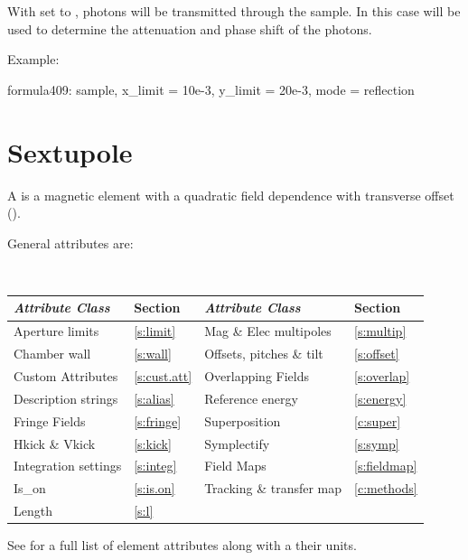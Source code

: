 {With  set to , photons will be transmitted
through the sample. In this case  will be used to
determine the attenuation and phase shift of the photons.

Example:
\begin{example}
  formula409: sample, x_limit = 10e-3, y_limit = 20e-3, mode = reflection
\end{example}

\newpage

\section{Sextupole}
\label{s:sex}

A  is a magnetic element with a quadratic field
dependence with transverse offset ().

General  attributes are:
\begin{center}
\tt
\begin{tabular}{llll} \toprule
  {\sl Attribute Class}      & Section           & {\sl Attribute Class}      & Section           \\ \midrule
  Aperture limits            & \ref{s:limit}     & Mag \& Elec multipoles     & \ref{s:multip}    \\
  Chamber wall               & \ref{s:wall}      & Offsets, pitches \& tilt   & \ref{s:offset}    \\
  Custom Attributes          & \ref{s:cust.att}  & Overlapping Fields         & \ref{s:overlap}   \\
  Description strings        & \ref{s:alias}     & Reference energy           & \ref{s:energy}    \\ 
  Fringe Fields              & \ref{s:fringe}    & Superposition              & \ref{c:super}     \\
  Hkick \& Vkick             & \ref{s:kick}      & Symplectify                & \ref{s:symp}      \\
  Integration settings       & \ref{s:integ}     & Field Maps                 & \ref{s:fieldmap}  \\
  Is_on                      & \ref{s:is.on}     & Tracking \& transfer map   & \ref{c:methods}   \\ 
  Length                     & \ref{s:l}         &                            &                   \\ 
  \bottomrule
\end{tabular}
\end{center}
\toffset
See  for a full list of element attributes along with a their units.

}
